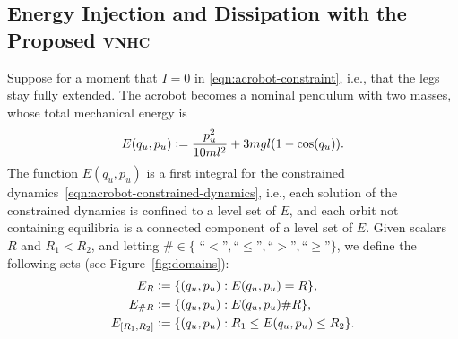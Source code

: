 \documentclass[journal,twoside,web, twocolumn]{ieeecolor}
\newcommand*{\eqdef}{\vcentcolon=}
\newcommand*{\vnhc}{\textsc{vnhc}\xspace}
\begin{document}
\subsection{Energy Injection and Dissipation with the Proposed \vnhc}\label{sec:energy-inject-diss}
Suppose for a moment that \(I = 0\) in \eqref{eqn:acrobot-constraint}, i.e.,
that the legs stay fully extended.
The acrobot becomes a nominal pendulum with two masses, whose total mechanical
energy is
\begin{equation}\label{eqn:nominal-energy}
    E(q_u,p_u) \eqdef \frac{p_u^2}{10ml^2} + 3mgl(1 - \cos(q_u))
    .
\end{equation}
The function $E(q_u,p_u)$ is a first integral for the constrained
dynamics~\eqref{eqn:acrobot-constrained-dynamics}, i.e., each solution of the
constrained dynamics is confined to a level set of $E$, and each orbit not
containing equilibria is a connected component of a level set of $E$. Given
scalars $R$ and $R_1<R_2$, and letting $\# \in \{$
``$<$''$,$``$\leq$''$,$``$>$''$,$``$\geq$''$\}$, we define the following sets
(see Figure~\ref{fig:domains}):
\begin{equation}\label{eq:E_sets}
\begin{aligned}
E_R &\eqdef \{(q_u,p_u): E(q_u,p_u) = R\}, \\
E_{\# R} &\eqdef \{(q_u,p_u): E(q_u,p_u) \#R\}, \\
E_{[R_1,R_2]} &\eqdef \{(q_u,p_u): R_1 \leq E(q_u,p_u) \leq R_2\}.
\end{aligned}
\end{equation}
%
%
%
\end{document}
